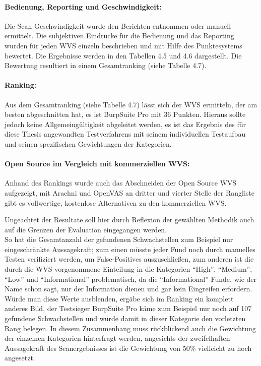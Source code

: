 \documentclass[12pt,oneside,a4paper,parskip,pointlessnumbers]{scrbook}
\begin{document}
\paragraph{Bedienung, Reporting und Geschwindigkeit:}
Die Scan-Geschwindigkeit wurde den Berichten entnommen oder manuell ermittelt. Die subjektiven Eindrücke für die Bedienung und das Reporting wurden für jeden WVS einzeln beschrieben und mit Hilfe des Punktesystems bewertet. Die Ergebnisse werden in den Tabellen 4.5 und 4.6 dargestellt. Die Bewertung resultiert in einem Gesamtranking (siehe Tabelle 4.7).
\paragraph{Ranking:} Aus dem Gesamtranking (siehe Tabelle 4.7) lässt sich der WVS ermitteln, der am besten abgeschnitten hat, es ist BurpSuite Pro mit 36 Punkten. Hieraus sollte jedoch keine Allgemeingültigkeit abgeleitet werden, es ist das Ergebnis des für diese Thesis angewandten Testverfahrens mit seinem individuellen Testaufbau und seinen spezifischen Gewichtungen der Kategorien.
\paragraph{Open Source im Vergleich mit kommerziellen WVS:}
Anhand des Rankings wurde auch das Abschneiden der Open Source WVS aufgezeigt, mit Arachni und OpenVAS an dritter und vierter Stelle der Rangliste gibt es vollwertige, kostenlose Alternativen zu den kommerziellen WVS.

Ungeachtet der Resultate soll hier durch Reflexion der gewählten Methodik auch auf die Grenzen der Evaluation eingegangen werden.\\
So hat die Gesamtanzahl der gefundenen Schwachstellen zum Beispiel nur eingeschränkte Aussagekraft; zum einen müsste jeder Fund noch durch manuelles Testen verifiziert werden, um False-Positives auszuschließen, zum anderen ist die durch die WVS vorgenommene Einteilung in die Kategorien ``High'', ``Medium'', ``Low'' und ``Informational'' problematisch, da die ``Informational''-Funde, wie der Name schon sagt, nur der Information dienen und gar kein Eingreifen erfordern. Würde man diese Werte ausblenden, ergäbe sich im Ranking ein komplett anderes Bild, der Testsieger BurpSuite Pro käme zum Beispiel nur noch auf 107 gefundene Schwachstellen und würde damit in dieser Kategorie den vorletzten Rang belegen. In diesem Zusammenhang muss rückblickend auch die Gewichtung der einzelnen Kategorien hinterfragt werden, angesichts der zweifelhaften Aussagekraft des Scanergebnisses ist die Gewichtung von 50\% vielleicht zu hoch angesetzt.
\end{document}
